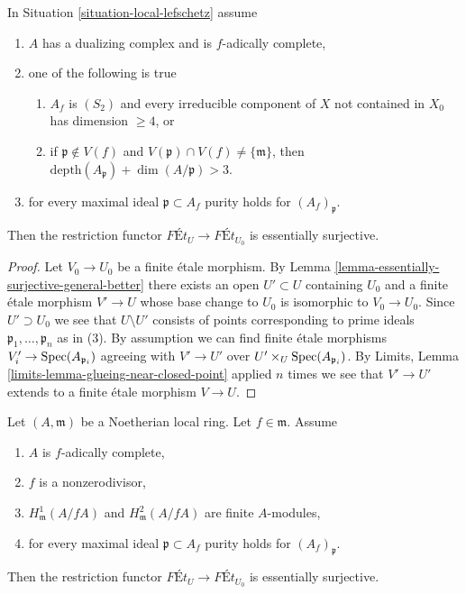 \begin{lemma}
\label{lemma-equivalence-better}
In Situation \ref{situation-local-lefschetz} assume
\begin{enumerate}
\item $A$ has a dualizing complex and is $f$-adically complete,
\item one of the following is true
\begin{enumerate}
\item $A_f$ is $(S_2)$ and every irreducible component of $X$
not contained in $X_0$ has dimension $\geq 4$, or
\item if $\mathfrak p \not \in V(f)$ and
$V(\mathfrak p) \cap V(f) \not = \{\mathfrak m\}$, then
$\text{depth}(A_\mathfrak p) + \dim(A/\mathfrak p) > 3$.
\end{enumerate}
\item for every maximal ideal $\mathfrak p \subset A_f$
purity holds for $(A_f)_\mathfrak p$.
\end{enumerate}
Then the restriction functor $\textit{F\'Et}_U \to \textit{F\'Et}_{U_0}$
is essentially surjective.
\end{lemma}

\begin{proof}
Let $V_0 \to U_0$ be a finite \'etale morphism. By
Lemma \ref{lemma-essentially-surjective-general-better}
there exists an open $U' \subset U$ containing $U_0$ and
a finite \'etale morphism $V' \to U$ whose base change to $U_0$
is isomorphic to $V_0 \to U_0$. Since $U' \supset U_0$
we see that $U \setminus U'$ consists of points corresponding
to prime ideals $\mathfrak p_1, \ldots, \mathfrak p_n$ as in (3).
By assumption we can find finite \'etale morphisms
$V'_i \to \mathop{\mathrm{Spec}}(A_{\mathfrak p_i})$ agreeing with
$V' \to U'$ over $U' \times_U \mathop{\mathrm{Spec}}(A_{\mathfrak p_i})$.
By Limits, Lemma \ref{limits-lemma-glueing-near-closed-point}
applied $n$ times we see that $V' \to U'$ extends to a finite \'etale
morphism $V \to U$.
\end{proof}

\begin{lemma}
\label{lemma-equivalence}
Let $(A, \mathfrak m)$ be a Noetherian local ring.
Let $f \in \mathfrak m$. Assume
\begin{enumerate}
\item $A$ is $f$-adically complete,
\item $f$ is a nonzerodivisor,
\item $H^1_\mathfrak m(A/fA)$ and $H^2_\mathfrak m(A/fA)$ are finite
$A$-modules,
\item for every maximal ideal $\mathfrak p \subset A_f$
purity holds for $(A_f)_\mathfrak p$.
\end{enumerate}
Then the restriction functor $\textit{F\'Et}_U \to \textit{F\'Et}_{U_0}$
is essentially surjective.
\end{lemma}

